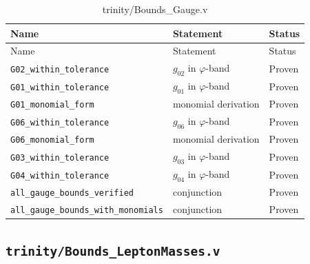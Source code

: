 \begin{longtable}{lll}
\toprule
Name & Statement & Status \\
\midrule
\endfirsthead
\toprule
Name & Statement & Status \\
\midrule
\endhead
\bottomrule
\endfoot
\bottomrule
\caption{trinity/Bounds\_Gauge.v}
\endlastfoot
\texttt{G02\_within\_tolerance} & $g_{02}$ in $\varphi$-band & Proven \\
\texttt{G01\_within\_tolerance} & $g_{01}$ in $\varphi$-band & Proven \\
\texttt{G01\_monomial\_form} & monomial derivation & Proven \\
\texttt{G06\_within\_tolerance} & $g_{06}$ in $\varphi$-band & Proven \\
\texttt{G06\_monomial\_form} & monomial derivation & Proven \\
\texttt{G03\_within\_tolerance} & $g_{03}$ in $\varphi$-band & Proven \\
\texttt{G04\_within\_tolerance} & $g_{04}$ in $\varphi$-band & Proven \\
\texttt{all\_gauge\_bounds\_verified} & conjunction & Proven \\
\texttt{all\_gauge\_bounds\_with\_monomials} & conjunction & Proven \\
\end{longtable}

\subsection{\texttt{trinity/Bounds\_LeptonMasses.v}}
\label{sec:A-coq-leptons}

